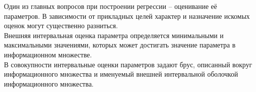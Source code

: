 Один из главных вопросов при построении регрессии -- оценивание её параметров. В зависимости от прикладных целей характер и назначение искомых оценок могут существенно разниться. \\
Внешняя интервальная оценка параметра определяется минимальными и максимальными значениями, которых может достигать значение параметра в информационном множестве. \\
В совокупности интервальные оценки параметров задают брус, описанный вокруг информационного множества и именуемый внешней интервальной оболочкой информационного множества. 


\newpage
